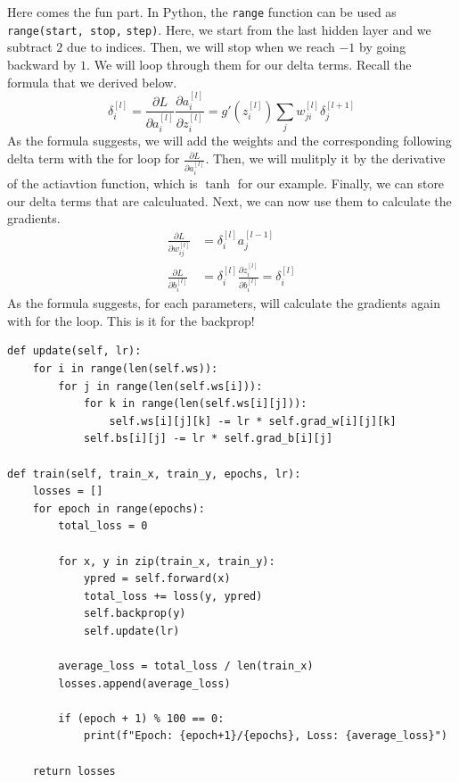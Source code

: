 \documentclass[../../main.tex]{subfiles}
\begin{document}
Here comes the fun part. In Python, the \verb|range| function can be
used as \verb|range(start, stop,| \verb|step)|. Here, we start from
the last hidden layer and we subtract $2$ due to indices. Then,
we will stop when we reach $-1$ by going backward by $1$. We will
loop through them for our delta terms. Recall the formula that we
derived below.
\[
\delta_i^{[l]}
= \frac{\partial L}{\partial a_i^{[l]}}
    \frac{\partial a_i^{[l]}}{\partial z_i^{[l]}}
= g'\left(z_i^{[l]}\right) \sum_j w_{ji}^{[l]} \delta_j^{[l+1]}
\]
As the formula suggests, we will add the weights and the
corresponding following delta term with the for loop for
$\frac{\partial L}{\partial a_i^{[l]}}$. Then, we will mulitply
it by the derivative of the actiavtion function, which is $\tanh$
for our example. Finally, we can store our delta terms that are
calculuated. Next, we can now use them to calculate the gradients.
\begin{align*}
\frac{\partial L}{\partial w_{ij}^{[l]}}
&= \delta_i^{[l]} a_j^{[l-1]} \\
\frac{\partial L}{\partial b_i^{[l]}}
&= \delta_i^{[l]} \frac{\partial z_i^{[l]}}{\partial b_i^{[l]}}
= \delta_i^{[l]}
\end{align*}
As the formula suggests, for each parameters, will calculate
the gradients again with for the loop. This is it for the backprop!

\begin{jupyter}
\begin{lstlisting}[style=jin]
def update(self, lr):
    for i in range(len(self.ws)):
        for j in range(len(self.ws[i])):
            for k in range(len(self.ws[i][j])):
                self.ws[i][j][k] -= lr * self.grad_w[i][j][k]
            self.bs[i][j] -= lr * self.grad_b[i][j]

def train(self, train_x, train_y, epochs, lr):
    losses = []
    for epoch in range(epochs):
        total_loss = 0

        for x, y in zip(train_x, train_y):
            ypred = self.forward(x)
            total_loss += loss(y, ypred)
            self.backprop(y)
            self.update(lr)

        average_loss = total_loss / len(train_x)
        losses.append(average_loss)
        
        if (epoch + 1) % 100 == 0:
            print(f"Epoch: {epoch+1}/{epochs}, Loss: {average_loss}")
            
    return losses
\end{lstlisting}
\begin{lstlisting}[style=jout]
\end{lstlisting}
\end{jupyter}
\end{document}
